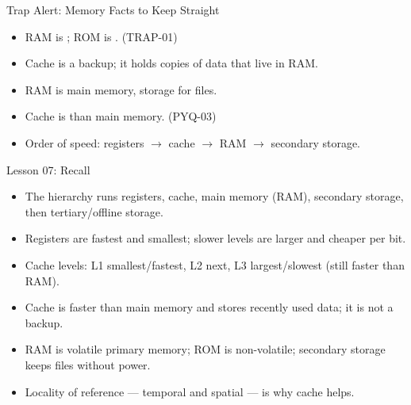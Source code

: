 \documentclass[aspectratio=169]{beamer}
\begin{document}
\begin{frame}{Trap Alert: Memory Facts to Keep Straight}
  \begin{itemize}
    \item RAM is ; ROM is . (TRAP-01)
    \item Cache is  a backup; it holds copies of data that live in
      RAM.
    \item RAM is main memory,  storage for files.
    \item Cache is  than main memory. (PYQ-03)
    \item Order of speed: registers $\rightarrow$ cache $\rightarrow$ RAM
      $\rightarrow$ secondary storage.
  \end{itemize}
\end{frame}

\begin{frame}{Lesson 07: Recall}
  \begin{itemize}
    \item The hierarchy runs registers, cache, main memory (RAM), secondary
      storage, then tertiary/offline storage.
    \item Registers are fastest and smallest; slower levels are larger and
      cheaper per bit.
    \item Cache levels: L1 smallest/fastest, L2 next, L3 largest/slowest
      (still faster than RAM).
    \item Cache is faster than main memory and stores recently used data;
      it is not a backup.
    \item RAM is volatile primary memory; ROM is non-volatile; secondary
      storage keeps files without power.
    \item Locality of reference --- temporal and spatial --- is why cache
      helps.
  \end{itemize}
\end{frame}
\end{document}
